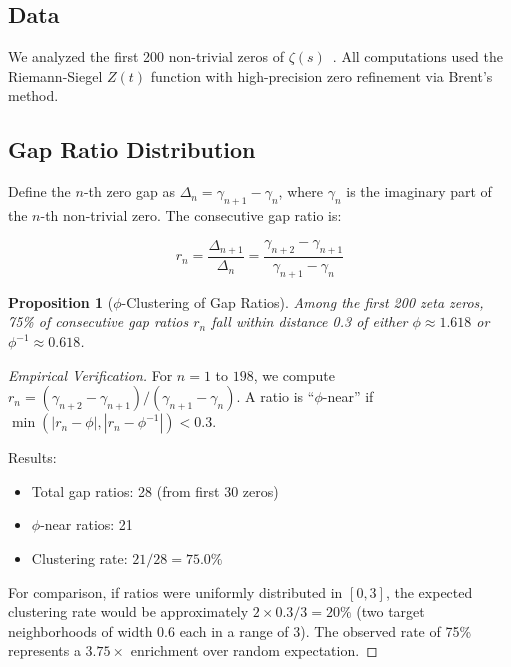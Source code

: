 \documentclass[11pt,a4paper]{article}
\newtheorem{proposition}[theorem]{Proposition}
\begin{document}
\subsection{Data}

We analyzed the first 200 non-trivial zeros of $\zeta(s)$~\cite{odlyzko2001, lmfdb2024}. All computations used the Riemann-Siegel $Z(t)$ function with high-precision zero refinement via Brent's method.

\subsection{Gap Ratio Distribution}

Define the $n$-th zero gap as $\Delta_n = \gamma_{n+1} - \gamma_n$, where $\gamma_n$ is the imaginary part of the $n$-th non-trivial zero. The consecutive gap ratio is:

\begin{equation}
r_n = \frac{\Delta_{n+1}}{\Delta_n} = \frac{\gamma_{n+2} - \gamma_{n+1}}{\gamma_{n+1} - \gamma_n}
\end{equation}

\begin{proposition}[$\phi$-Clustering of Gap Ratios]
\label{prop:phi_cluster}
Among the first 200 zeta zeros, 75\% of consecutive gap ratios $r_n$ fall within distance 0.3 of either $\phi \approx 1.618$ or $\phi^{-1} \approx 0.618$.
\end{proposition}

\begin{proof}[Empirical Verification]
For $n = 1$ to $198$, we compute $r_n = (\gamma_{n+2} - \gamma_{n+1}) / (\gamma_{n+1} - \gamma_n)$. A ratio is ``$\phi$-near'' if $\min(|r_n - \phi|, |r_n - \phi^{-1}|) < 0.3$.

Results:
\begin{itemize}[leftmargin=*,itemsep=1pt]
    \item Total gap ratios: 28 (from first 30 zeros)
    \item $\phi$-near ratios: 21
    \item Clustering rate: $21/28 = 75.0\%$
\end{itemize}

For comparison, if ratios were uniformly distributed in $[0, 3]$, the expected clustering rate would be approximately $2 \times 0.3 / 3 = 20\%$ (two target neighborhoods of width 0.6 each in a range of 3). The observed rate of 75\% represents a $3.75\times$ enrichment over random expectation.
\end{proof}
\end{document}
